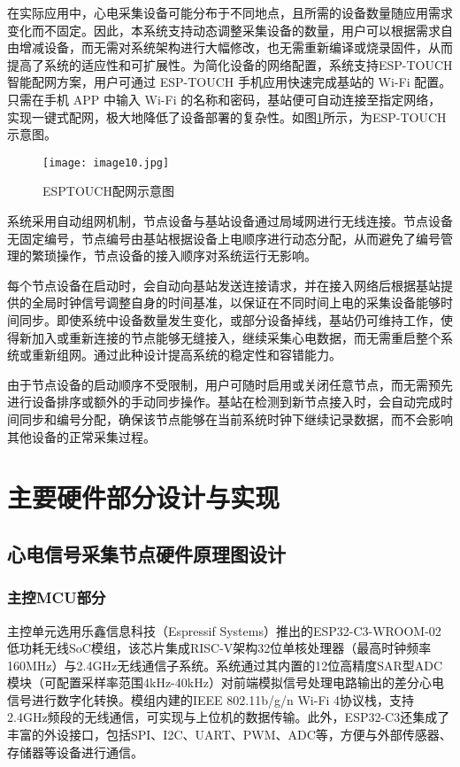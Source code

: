 在实际应用中，心电采集设备可能分布于不同地点，且所需的设备数量随应用需求变化而不固定。因此，本系统支持动态调整采集设备的数量，用户可以根据需求自由增减设备，而无需对系统架构进行大幅修改，也无需重新编译或烧录固件，从而提高了系统的适应性和可扩展性。为简化设备的网络配置，系统支持ESP-TOUCH智能配网方案，用户可通过 ESP-TOUCH 手机应用快速完成基站的 Wi-Fi 配置。只需在手机 APP 中输入 Wi-Fi 的名称和密码，基站便可自动连接至指定网络，实现一键式配网，极大地降低了设备部署的复杂性。如图\ref{F.ECG_image10}所示，为ESP-TOUCH示意图。

\begin{figure}[hbt]
    \centering
    \texttt{[image: image10.jpg]}
    \caption{ESPTOUCH配网示意图}
    \label{F.ECG_image10}
\end{figure}

系统采用自动组网机制，节点设备与基站设备通过局域网进行无线连接。节点设备无固定编号，节点编号由基站根据设备上电顺序进行动态分配，从而避免了编号管理的繁琐操作，节点设备的接入顺序对系统运行无影响。

每个节点设备在启动时，会自动向基站发送连接请求，并在接入网络后根据基站提供的全局时钟信号调整自身的时间基准，以保证在不同时间上电的采集设备能够时间同步。即使系统中设备数量发生变化，或部分设备掉线，基站仍可维持工作，使得新加入或重新连接的节点能够无缝接入，继续采集心电数据，而无需重启整个系统或重新组网。通过此种设计提高系统的稳定性和容错能力。

由于节点设备的启动顺序不受限制，用户可随时启用或关闭任意节点，而无需预先进行设备排序或额外的手动同步操作。基站在检测到新节点接入时，会自动完成时间同步和编号分配，确保该节点能够在当前系统时钟下继续记录数据，而不会影响其他设备的正常采集过程。

\newpage    %

\section{主要硬件部分设计与实现}

\subsection{心电信号采集节点硬件原理图设计}

\subsubsection{主控MCU部分}

主控单元选用乐鑫信息科技（Espressif Systems）推出的ESP32-C3-WROOM-02低功耗无线SoC模组，该芯片集成RISC-V架构32位单核处理器（最高时钟频率160MHz）与2.4GHz无线通信子系统。系统通过其内置的12位高精度SAR型ADC模块（可配置采样率范围4kHz-40kHz）对前端模拟信号处理电路输出的差分心电信号进行数字化转换。模组内建的IEEE 802.11b/g/n Wi-Fi 4协议栈，支持2.4GHz频段的无线通信，可实现与上位机的数据传输。此外，ESP32-C3还集成了丰富的外设接口，包括SPI、I2C、UART、PWM、ADC等，方便与外部传感器、存储器等设备进行通信。

